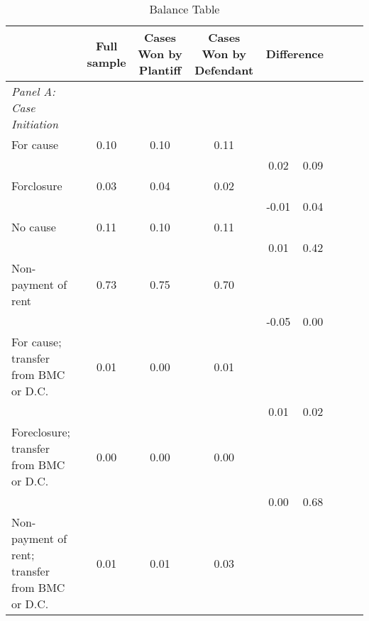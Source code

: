 \begin{table}[htbp]\centering
\def\sym#1{\ifmmode^{#1}\else\(^{#1}\)\fi}
\caption{Balance Table}
\begin{tabular}{l*{4}{cc}}
\toprule
                    &\multicolumn{1}{c}{Full sample}&\multicolumn{1}{c}{Cases Won by Plantiff}&\multicolumn{1}{c}{Cases Won by Defendant}&\multicolumn{2}{c}{Difference}\\
\midrule
\emph{Panel A: Case Initiation}&            &            &            &            &            \\
\hspace{0.25cm}For cause&        0.10&        0.10&        0.11&            &            \\
                    &            &            &            &        0.02&        0.09\\
\hspace{0.25cm}Forclosure&        0.03&        0.04&        0.02&            &            \\
                    &            &            &            &       -0.01&        0.04\\
\hspace{0.25cm}No cause&        0.11&        0.10&        0.11&            &            \\
                    &            &            &            &        0.01&        0.42\\
\hspace{0.25cm}Non-payment of rent&        0.73&        0.75&        0.70&            &            \\
                    &            &            &            &       -0.05&        0.00\\
\hspace{0.25cm}For cause; transfer from BMC or D.C.&        0.01&        0.00&        0.01&            &            \\
                    &            &            &            &        0.01&        0.02\\
\hspace{0.25cm}Foreclosure; transfer from BMC or D.C.&        0.00&        0.00&        0.00&            &            \\
                    &            &            &            &        0.00&        0.68\\
\hspace{0.25cm}Non-payment of rent; transfer from BMC or D.C.&        0.01&        0.01&        0.03&            &            \\

\end{tabular}
\end{table}
